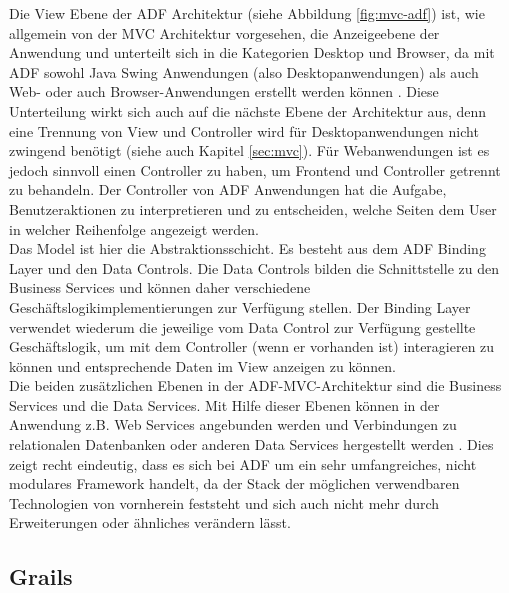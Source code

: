 Die View Ebene der ADF Architektur (siehe Abbildung \ref{fig:mvc-adf}) ist, wie allgemein von der MVC Architektur vorgesehen, die Anzeigeebene der Anwendung und unterteilt sich in die Kategorien Desktop und Browser, da mit ADF sowohl Java Swing Anwendungen (also Desktopanwendungen) als auch Web- oder auch Browser-Anwendungen erstellt werden können \autocite[S.22]{AUW2009}. Diese Unterteilung wirkt sich auch auf die nächste Ebene der Architektur aus, denn eine Trennung von View und Controller wird für Desktopanwendungen nicht zwingend benötigt (siehe auch Kapitel \ref{sec:mvc}). Für Webanwendungen ist es jedoch sinnvoll einen Controller zu haben, um Frontend und Controller getrennt zu behandeln. Der Controller von ADF Anwendungen hat die Aufgabe, Benutzeraktionen zu interpretieren und zu entscheiden, welche Seiten dem User in welcher Reihenfolge angezeigt werden\autocite[S.12]{OAEAD2014}.\\
Das Model ist hier die Abstraktionsschicht. Es besteht aus dem ADF Binding Layer und den Data Controls. Die Data Controls bilden die Schnittstelle zu den Business Services und können daher verschiedene Geschäftslogikimplementierungen zur Verfügung stellen. Der Binding Layer verwendet wiederum die jeweilige vom Data Control zur Verfügung gestellte Geschäftslogik, um mit dem Controller (wenn er vorhanden ist) interagieren zu können und entsprechende Daten im View anzeigen zu können. \autocite[S.6]{ARIA2015}\\
Die beiden zusätzlichen Ebenen in der ADF-MVC-Architektur sind die Business Services und die Data Services. Mit Hilfe dieser Ebenen können in der Anwendung z.B. Web Services angebunden werden und  Verbindungen zu relationalen Datenbanken oder anderen Data Services hergestellt werden \autocite[S.13]{OAEAD2014}. Dies zeigt recht eindeutig, dass es sich bei ADF um ein sehr umfangreiches, nicht modulares Framework handelt, da der Stack der möglichen verwendbaren Technologien von vornherein feststeht und sich auch nicht mehr durch Erweiterungen oder ähnliches verändern lässt.

\subsection{Grails}
\label{sec:grails}
